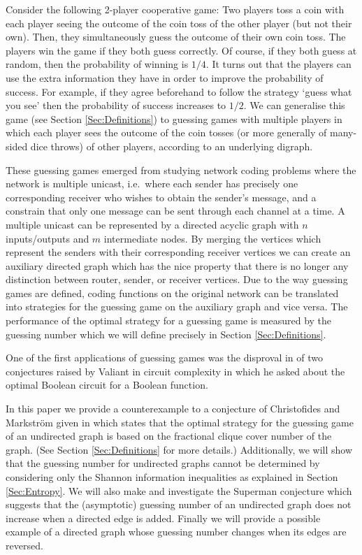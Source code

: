 \documentclass[a4paper, 14pt]{extarticle}
\theoremstyle{plain}
\begin{document}
Consider the following 2-player cooperative game: Two players toss a coin with each player seeing the outcome of the coin toss of the other player (but not their own). Then, they simultaneously guess the outcome of their own coin toss. The players win the game if they both guess correctly. Of course, if they both guess at random, then the probability of winning is $1/4$. It turns out that the players can use the extra information they have in order to improve the probability of success. For example, if they agree beforehand to follow the strategy `guess what you see' then the probability of success increases to $1/2$. We can generalise this game (see Section \ref{Sec:Definitions}) to guessing games with multiple players in which each player sees the outcome of the coin tosses (or more generally of many-sided dice throws) of other players, according to an underlying digraph. 

These guessing games \cite{Riis07,Riis07A} emerged from studying network coding problems \cite{AhlswedeCLY00} where the network is multiple unicast, i.e.~where each sender has precisely one corresponding receiver who wishes to obtain the sender's message, and a constrain that only one message can be sent through each channel at a time. A multiple unicast can be represented by a directed acyclic graph with $n$ inputs/outputs and $m$ intermediate nodes. By merging the vertices which represent the senders with their corresponding receiver vertices %
we can create an auxiliary directed graph which has the nice property that there is no longer any distinction between router, sender, or receiver vertices. Due to the way guessing games are defined, coding functions on the original network can be translated into strategies for the guessing game on the auxiliary graph and vice versa. The performance of the optimal strategy for a guessing game is measured by the guessing number which we will define precisely in Section \ref{Sec:Definitions}.

One of the first applications of guessing games was the disproval in \cite{Riis07} of two conjectures raised by Valiant \cite{Valiant} in circuit complexity in which he asked about the optimal Boolean circuit for a Boolean function. %

In this paper we provide a counterexample to a conjecture of Christofides and Markstr\"om given in \cite{Christofides&Markstrom11} which states that the optimal strategy for the guessing game of an undirected graph is based on the fractional clique cover number of the graph. (See Section \ref{Sec:Definitions} for more details.) Additionally, we will show that the guessing number for undirected graphs cannot be determined by considering only the {S}hannon information inequalities as explained in Section \ref{Sec:Entropy}. We will also make and investigate the Superman conjecture which suggests that the (asymptotic) guessing number of an undirected graph does not increase when a directed edge is added. Finally we will provide a possible example of a directed graph whose guessing number changes when its edges are reversed.
\end{document}
